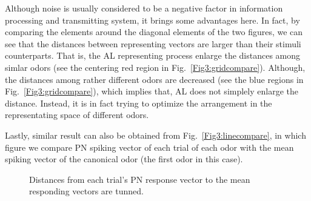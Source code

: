 \documentclass[12pt, a4paper]{article}
\begin{document}
Although noise is usually considered to be a negative factor in information processing and transmitting system, it brings some advantages here. In fact, by comparing the elements around the diagonal elements of the two figures, we can see that the distances between representing vectors are larger than their stimuli counterparts. That is, the AL representing process enlarge the distances among simlar odors (see the centering red region in Fig.~\ref{Fig3:gridcompare}). Although, the distances among rather different odors are decreased (see the blue regions in Fig.~\ref{Fig3:gridcompare}), which implies that, AL does not simplely enlarge the distance. Instead, it is in fact trying to optimize the arrangement in the representating space of different odors.

Lastly, similar result can also be obtained from Fig.~\ref{Fig3:linecompare}, in which figure we compare PN spiking vector of each trial of each odor with the mean spiking vector of the canonical odor (the first odor in this case).

\begin{figure}[htbp]\centering
    \hspace{0.5cm}

    \hspace{0.5cm}

\caption[sprate_decorr]{\label{Figure3:distance} \small Distances from each trial's PN response vector to the mean responding vectors are tunned.}
\end{figure}
\end{document}

